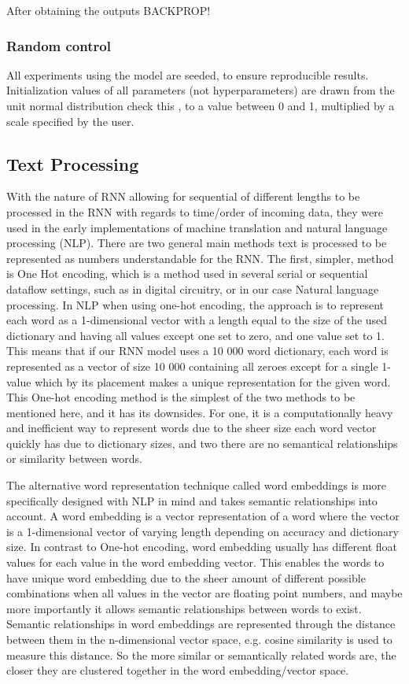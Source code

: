 \documentclass[12pt]{article}
\begin{document}
After obtaining the outputs BACKPROP!


\subsubsection*{Random control}
All experiments using the model are seeded, to ensure reproducible results. Initialization values of all parameters (not hyperparameters) are drawn from the unit normal distribution \color{red} check this \color{black}, to a value between 0 and 1, multiplied by a scale specified by the user.

\subsection{Text Processing}
With the nature of RNN allowing for sequential of different lengths to be processed in the RNN with regards to time/order of incoming data, they were used in the early implementations of machine translation and natural language processing (NLP). There are two general main methods text is processed to be represented as numbers understandable for the RNN. The first, simpler, method is One Hot encoding, which is a method used in several serial or sequential dataflow settings, such as in digital circuitry, or in our case Natural language processing. In NLP when using one-hot encoding, the approach is to represent each word as a 1-dimensional vector with a length equal to the size of the used dictionary and having all values except one set to zero, and one value set to 1. This means that if our RNN model uses a 10 000 word dictionary, each word is represented as a vector of size 10 000 containing all zeroes except for a single 1-value which by its placement makes a unique representation for the given word. This One-hot encoding method is the simplest of the two methods to be mentioned here, and it has its downsides. For one, it is a computationally heavy and inefficient way to represent words due to the sheer size each word vector quickly has due to dictionary sizes, and two there are no semantical relationships or similarity between words. 

The alternative word representation technique called word embeddings is more specifically designed with NLP in mind and takes semantic relationships into account. A word embedding is a vector representation of a word where the vector is a 1-dimensional vector of varying length depending on accuracy and dictionary size. In contrast to One-hot encoding, word embedding usually has different float values for each value in the word embedding vector. This enables the words to have unique word embedding due to the sheer amount of different possible combinations when all values in the vector are floating point numbers, and maybe more importantly it allows semantic relationships between words to exist. Semantic relationships in word embeddings are represented through the distance between them in the n-dimensional vector space, e.g. cosine similarity is used to measure this distance. So the more similar or semantically related words are, the closer they are clustered together in the word embedding/vector space.
\end{document}
